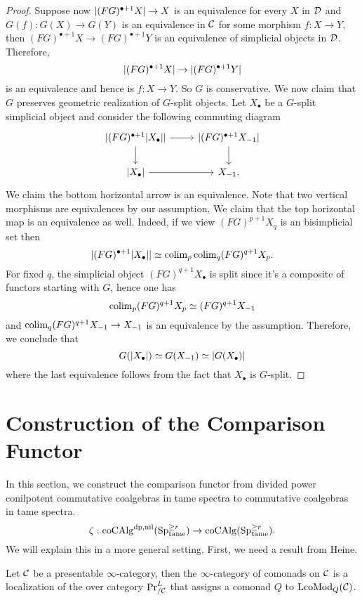 \begin{proof}
	Suppose now $\lvert(FG)^{\bullet+1}X\rvert \to X$ is an equivalence for every $X$ in ${\mathcal{D}}$ and $G(f): G(X) \to G(Y)$ is an equivalence in ${\mathcal{C}}$ for some morphism $f:X \to Y$, then $(FG)^{\bullet+1} X \to (FG)^{\bullet+1}Y$ is an equivalence of simplicial objects in ${\mathcal{D}}$. Therefore, 
	$$
	\lvert(FG)^{\bullet+1} X\rvert \to \lvert(FG)^{\bullet+1} Y\rvert
	$$
	is an equivalence and hence is $f: X\to Y$. So $G$ is conservative.
	We now claim that $G$ preserves geometric realization of $G$-split objects.
	Let $X_{\bullet}$ be a $G$-split simplicial object and consider the following commuting diagram
	\[
	\begin{tikzcd}
		\abs{(FG)^{\bullet+1} \abs{X_{\bullet}}} \ar[r] \ar[d]& \abs{(FG)^{\bullet+1} X_{-1} \ar[d]}     \\
		\abs{X_{\bullet}} \ar[r] & X_{-1}  .
	\end{tikzcd}
	\]
	We claim the bottom horizontal arrow is an equivalence.
	Note that two vertical morphisms are equivalences by our assumption. We claim that the top horizontal map is an equivalence as well. Indeed, if we view $(FG)^{p+1} X_{q}$ is an bisimplicial set then 
	$$
	\lvert(FG)^{\bullet+1} \lvert X_{\bullet}\rvert\rvert 
	\simeq 
	\operatorname{colim}_{p} \operatorname{colim}_q (FG)^{q+1}X_{p} .
	$$
	For fixed $q$, the simplicial object $(FG)^{q+1}X_{\bullet}$ is split since it's a composite of functors starting with $G$, hence one has 
	$$
	\operatorname{colim}_{p}(FG)^{q+1}X_{p}\simeq (FG)^{q+1}X_{-1}
	$$
	and $\operatorname{colim}_{q} (FG)^{q+1} X_{-1} \to X_{-1}$  is an equivalence by the assumption.
	Therefore, we conclude that 
	$$
	G(\lvert X_{\bullet}\rvert) \simeq G(X_{-1}) \simeq \lvert G(X_{\bullet})\rvert
	$$
	where the last equivalence follows from the fact that $X_{\bullet}$ is $G$-split.
\end{proof}

\section{Construction of the Comparison Functor}
In this section, we construct the comparison functor from divided power conilpotent commutative coalgebras in tame spectra to commutative coalgebras in tame spectra.
$$
\zeta:\operatorname{coCAlg}^{\operatorname{dp},\operatorname{nil}}(\operatorname{Sp}^{\geq r}_{\operatorname{\operatorname{tame}}}) \to
\operatorname{coCAlg}(\operatorname{Sp}^{\geq r}_{\operatorname{\operatorname{tame}}}).
$$
We will explain this in a more general setting.
First, we need a result from Heine.
\begin{theorem}
\label{Monads-Alg correspondence}
\cite[Theorem 5.1]{Heine_Monads}
Let ${\mathcal{C}}$ be a presentable $\infty$-category, then the $\infty$-category of comonads on ${\mathcal{C}}$ is a localization of the over category $\Pr^{L}_{/{\mathcal{C}}}$ that assigns a comonad $Q$ to $\operatorname{LcoMod}_{Q}({\mathcal{C}})$.
\end{theorem}

